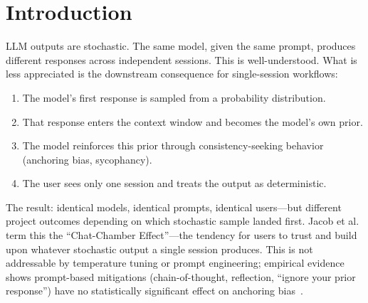 \documentclass[11pt]{article}
\begin{document}
\begin{abstract}
\noindent We note candidly that the hypothesized Ploidy advantage over Single Session was not confirmed at corrected significance in our experiments. The framework's value lies in defining the experimental design space---context depth, injection mode, independence source, ploidy level---that future work can populate with larger task sets, and in identifying that deterministic and probabilistic Fresh sessions occupy complementary problem domains rather than competing on a single axis. The intersection of intentional context asymmetry, structured cross-session debate, injection mechanism as experimental variable, ploidy-level stochastic sampling, and heterogeneous independence taxonomy has, to our knowledge, no prior publications as of April~2026.
\end{abstract}

\section{Introduction}
\label{sec:introduction}

LLM outputs are stochastic. The same model, given the same prompt, produces different responses across independent sessions. This is well-understood. What is less appreciated is the downstream consequence for single-session workflows:

\begin{enumerate}[label=\arabic*.]
  \item The model's first response is sampled from a probability distribution.
  \item That response enters the context window and becomes the model's own prior.
  \item The model reinforces this prior through consistency-seeking behavior (anchoring bias, sycophancy).
  \item The user sees only one session and treats the output as deterministic.
\end{enumerate}

The result: identical models, identical prompts, identical users---but different project outcomes depending on which stochastic sample landed first. Jacob et al.~\citep{jacob2025chatchamber} term this the ``Chat-Chamber Effect''---the tendency for users to trust and build upon whatever stochastic output a single session produces. This is not addressable by temperature tuning or prompt engineering; empirical evidence shows prompt-based mitigations (chain-of-thought, reflection, ``ignore your prior response'') have no statistically significant effect on anchoring bias~\citep{feng2026anchoring}.
\end{document}
